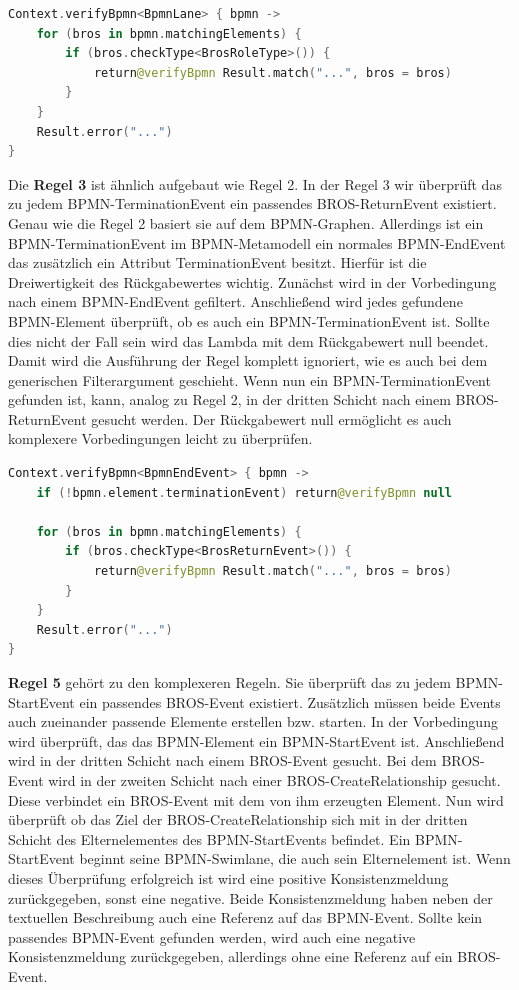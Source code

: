 \begin{lstlisting}[language=Kotlin, caption=Implementierung von Regel 2, label=lst:implementation_rule_2]
Context.verifyBpmn<BpmnLane> { bpmn ->
    for (bros in bpmn.matchingElements) {
        if (bros.checkType<BrosRoleType>()) {
            return@verifyBpmn Result.match("...", bros = bros)
        }
    }
    Result.error("...")
}
\end{lstlisting}

Die \textbf{Regel 3} ist ähnlich aufgebaut wie Regel 2.
In der Regel 3 wir überprüft das zu jedem BPMN-TerminationEvent ein passendes BROS-ReturnEvent existiert.
Genau wie die Regel 2 basiert sie auf dem BPMN-Graphen.
Allerdings ist ein BPMN-TerminationEvent im BPMN-Metamodell ein normales BPMN-EndEvent das zusätzlich ein Attribut TerminationEvent besitzt.
Hierfür ist die Dreiwertigkeit des Rückgabewertes wichtig.
Zunächst wird in der Vorbedingung nach einem BPMN-EndEvent gefiltert.
Anschließend wird jedes gefundene BPMN-Element überprüft, ob es auch ein BPMN-TerminationEvent ist.
Sollte dies nicht der Fall sein wird das Lambda mit dem Rückgabewert null beendet.
Damit wird die Ausführung der Regel komplett ignoriert, wie es auch bei dem generischen Filterargument geschieht.
Wenn nun ein BPMN-TerminationEvent gefunden ist, kann, analog zu Regel 2, in der dritten Schicht nach einem BROS-ReturnEvent gesucht werden.
Der Rückgabewert null ermöglicht es auch komplexere Vorbedingungen leicht zu überprüfen.

\begin{lstlisting}[language=Kotlin, caption=Implementierung von Regel 3, label=lst:implementation_rule_3]
Context.verifyBpmn<BpmnEndEvent> { bpmn ->
    if (!bpmn.element.terminationEvent) return@verifyBpmn null

    for (bros in bpmn.matchingElements) {
        if (bros.checkType<BrosReturnEvent>()) {
            return@verifyBpmn Result.match("...", bros = bros)
        }
    }
    Result.error("...")
}
\end{lstlisting}

\textbf{Regel 5} gehört zu den komplexeren Regeln.
Sie überprüft das zu jedem BPMN-StartEvent ein passendes BROS-Event existiert.
Zusätzlich müssen beide Events auch zueinander passende Elemente erstellen bzw. starten.
In der Vorbedingung wird überprüft, das das BPMN-Element ein BPMN-StartEvent ist.
Anschließend wird in der dritten Schicht nach einem BROS-Event gesucht.
Bei dem BROS-Event wird in der zweiten Schicht nach einer BROS-CreateRelationship gesucht.
Diese verbindet ein BROS-Event mit dem von ihm erzeugten Element.
Nun wird überprüft ob das Ziel der BROS-CreateRelationship sich mit in der dritten Schicht des Elternelementes des BPMN-StartEvents befindet.
Ein BPMN-StartEvent beginnt seine BPMN-Swimlane, die auch sein Elternelement ist.
Wenn dieses Überprüfung erfolgreich ist wird eine positive Konsistenzmeldung zurückgegeben, sonst eine negative.
Beide Konsistenzmeldung haben neben der textuellen Beschreibung auch eine Referenz auf das BPMN-Event.
Sollte kein passendes BPMN-Event gefunden werden, wird auch eine negative Konsistenzmeldung zurückgegeben, allerdings ohne eine Referenz auf ein BROS-Event.

